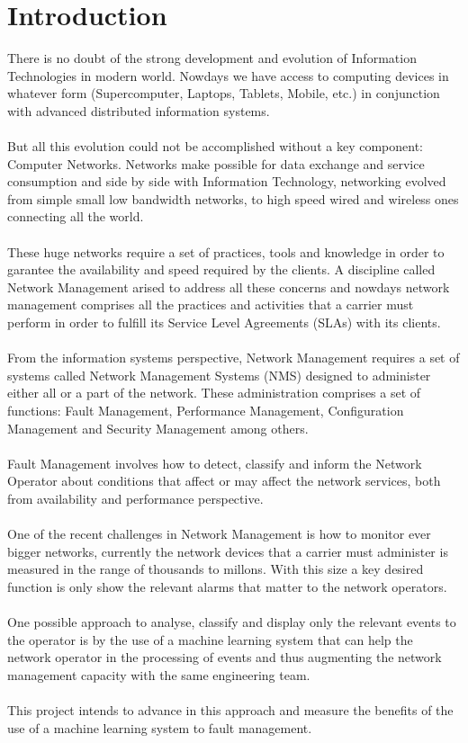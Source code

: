 \documentclass[10pt,a4paper]{article}
\begin{document}
 \section{Introduction}
 There is no doubt of the strong development and evolution of Information Technologies in modern world. Nowdays we have access to computing devices in whatever form (Supercomputer, Laptops, Tablets, Mobile, etc.) in conjunction with  advanced distributed information systems.
 \\\\
 But all this evolution could not be accomplished without a key component: Computer Networks. Networks make possible for data exchange and service consumption and side by side with Information Technology, networking evolved from simple small low bandwidth networks, to high speed wired and wireless ones connecting all the world.
 \\\\
 These huge networks require a set of practices, tools and knowledge in order to garantee the availability and speed required by the clients. A discipline called Network Management arised to address all these concerns and nowdays network management comprises all the practices and activities that a carrier must perform in order to fulfill its Service Level Agreements (SLAs) with its clients.
 \\\\
 From the information systems perspective, Network Management requires a set of systems called Network Management Systems (NMS) designed to administer either all or a part of the network. These administration comprises a set of functions: Fault Management, Performance Management, Configuration Management and Security Management among others.
 \\\\
 Fault Management involves how to detect, classify and inform the Network Operator about conditions that affect or may affect the network services, both from availability and performance perspective.
 \\\\
 One of the recent challenges in Network Management is how to monitor ever bigger networks, currently the network devices that a carrier must administer is measured in the range of thousands to millons. With this size a key desired function is only show the relevant alarms that matter to the network operators.
 \\\\
 One possible approach to analyse, classify and display only the relevant events to the operator is by the use of a machine learning system that can help the network operator in the processing of events and thus augmenting the network management capacity with the same engineering team.
 \\\\
 This project intends to advance in this approach and measure the benefits of the use of a machine learning system to fault management.
\end{document}
